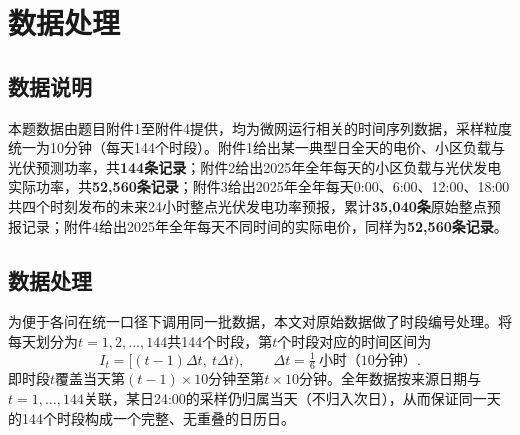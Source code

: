 \section{数据处理}

\subsection{数据说明}
本题数据由题目附件1至附件4提供，均为微网运行相关的时间序列数据，采样粒度统一为10分钟（每天144个时段）。附件1给出某一典型日全天的电价、小区负载与光伏预测功率，共\textbf{144条记录}；附件2给出2025年全年每天的小区负载与光伏发电实际功率，共\textbf{52{,}560条记录}；附件3给出2025年全年每天0:00、6:00、12:00、18:00共四个时刻发布的未来24小时整点光伏发电功率预报，累计\textbf{35{,}040条}原始整点预报记录；附件4给出2025年全年每天不同时间的实际电价，同样为\textbf{52{,}560条记录}。

\subsection{数据处理}
为便于各问在统一口径下调用同一批数据，本文对原始数据做了时段编号处理。将每天划分为$t=1,2,\ldots,144$共144个时段，第$t$个时段对应的时间区间为
\begin{equation}
I_t=\big[(t-1)\Delta t,\ t\Delta t\big),\qquad \Delta t=\tfrac16\ \text{小时（10分钟）}.
\end{equation}
即时段$t$覆盖当天第$(t-1)\times10$分钟至第$t\times10$分钟。全年数据按来源日期与$t=1,\ldots,144$关联，某日24:00的采样仍归属当天（不归入次日），从而保证同一天的144个时段构成一个完整、无重叠的日历日。